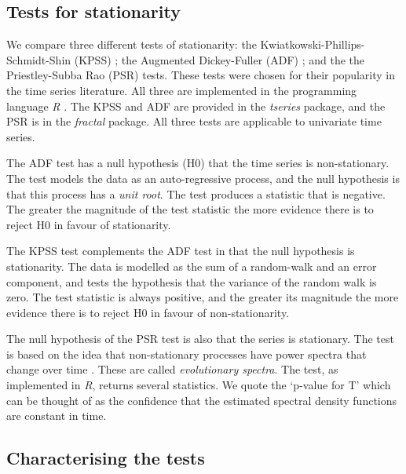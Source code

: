 \subsection{Tests for stationarity}
\label{sec:stat_tests}

We compare three different tests of stationarity: the Kwiatkowski-Phillips-Schmidt-Shin (KPSS) \cite{kwiatkowski1992testing}; the Augmented Dickey-Fuller (ADF) \cite{said1984testing}; and the the Priestley-Subba Rao (PSR) \cite{priestley1969test} tests. These tests were chosen for their popularity in the time series literature. All three are implemented in the programming language \emph{R} \cite{Rlanguage}. The KPSS and ADF are provided in the \emph{tseries} package, and the PSR is in the \emph{fractal} package. All three tests are applicable to univariate time series.

The ADF test has a null hypothesis (H0) that the time series is non-stationary. The test models the data as an auto-regressive process, and the null hypothesis is that this process has a \emph{unit root}. The test produces a statistic that is negative. The greater the magnitude of the test statistic the more evidence there is to reject H0 in favour of stationarity.

The KPSS test complements the ADF test in that the null hypothesis is stationarity. The data is modelled as the sum of a random-walk and an error component, and tests the hypothesis that the variance of the random walk is zero. The test statistic is always positive, and the greater its magnitude the more evidence there is to reject H0 in favour of non-stationarity.

The null hypothesis of the PSR test is also that the series is stationary. The test is based on the idea that non-stationary processes have power spectra that change over time \cite{priestley1969test}. These are called \emph{evolutionary spectra}. The test, as implemented in \emph{R}, returns several statistics. We quote the `p-value for T' which can be thought of as the confidence that the estimated spectral density functions are constant in time.

\subsection{Characterising the tests}
\label{sec:characterising_stat_tests}


